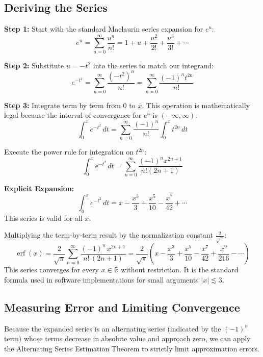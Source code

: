 \documentclass[11pt]{article}
\begin{document}
\subsection{Deriving the Series}

\begin{methodbox}
\textbf{Step 1:} Start with the standard Maclaurin series expansion for $e^u$:
\[ e^u = \sum_{n=0}^{\infty} \frac{u^n}{n!} = 1 + u + \frac{u^2}{2!} + \frac{u^3}{3!} + \cdots \]

\textbf{Step 2:} Substitute $u = -t^2$ into the series to match our integrand:
\[ e^{-t^2} = \sum_{n=0}^{\infty} \frac{(-t^2)^n}{n!} = \sum_{n=0}^{\infty} \frac{(-1)^n t^{2n}}{n!} \]

\textbf{Step 3:} Integrate term by term from $0$ to $x$. This operation is mathematically legal because the interval of convergence for $e^u$ is $(-\infty, \infty)$.
\[ \int_{0}^{x} e^{-t^2} \, dt = \sum_{n=0}^{\infty} \frac{(-1)^n}{n!} \int_{0}^{x} t^{2n} \, dt \]

Execute the power rule for integration on $t^{2n}$:
\[ \int_{0}^{x} e^{-t^2} \, dt = \sum_{n=0}^{\infty} \frac{(-1)^n x^{2n+1}}{n!(2n+1)} \]

\textbf{Explicit Expansion:}
\[ \int_{0}^{x} e^{-t^2} \, dt = x - \frac{x^3}{3} + \frac{x^5}{10} - \frac{x^7}{42} + \cdots \]
This series is valid for all $x$.
\end{methodbox}

\begin{theorembox}
Multiplying the term-by-term result by the normalization constant $\frac{2}{\sqrt{\pi}}$:
\[
\operatorname{erf}(x) = \frac{2}{\sqrt{\pi}} \sum_{n=0}^{\infty} \frac{(-1)^n\,x^{2n+1}}{n!\,(2n+1)}
= \frac{2}{\sqrt{\pi}}\!\left(x - \frac{x^3}{3} + \frac{x^5}{10} - \frac{x^7}{42} + \frac{x^9}{216} - \cdots\right)
\]
This series converges for every $x \in \mathbb{R}$ without restriction. It is the standard formula used in software implementations for small arguments $|x| \lesssim 3$.
\end{theorembox}

\subsection{Measuring Error and Limiting Convergence}

Because the expanded series is an alternating series (indicated by the $(-1)^n$ term) whose terms decrease in absolute value and approach zero, we can apply the Alternating Series Estimation Theorem to strictly limit approximation errors.
\end{document}
